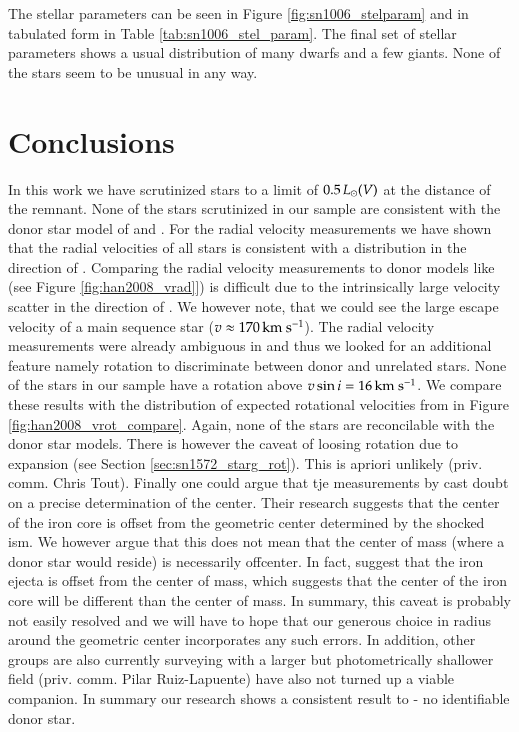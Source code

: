 The stellar parameters can be seen in Figure \ref{fig:sn1006_stelparam} and in tabulated form in Table \ref{tab:sn1006_stel_param}. The final set of stellar parameters shows a usual distribution of many dwarfs and a few giants. None of the stars seem to be unusual in any way. 


\section{Conclusions}
In this work we have scrutinized stars to a limit of $0.5\,\hbox{$L_{\odot}$}(V)$ at the distance of the remnant. None of the stars scrutinized in our sample are consistent with the donor star model of \citet{2000ApJS..128..615M} and \citet{2008A&A...489..943P}. For the radial velocity measurements we have shown that the radial velocities of all stars is consistent with a distribution in the direction of . Comparing the radial velocity measurements to donor models like (see Figure \vref{fig:han2008_vrad}]) is difficult due to the intrinsically large velocity scatter in the direction of . We however note, that we could see the large escape velocity of a main sequence star ($v\approx170\,\textrm{km}~\textrm{s}^{-1}$). The radial velocity measurements were already ambiguous in  and thus we looked for an additional feature namely rotation to discriminate between donor and unrelated stars. None of the stars in our sample have a rotation above $v\sin{i}=16\,\textrm{km}~\textrm{s}^{-1}$. We compare these results with the distribution of expected rotational velocities from \citet{2008ApJ...677L.109H} in Figure \ref{fig:han2008_vrot_compare}. Again, none of the stars are reconcilable with the donor star models. There is however the caveat of loosing rotation due to expansion (see Section \ref{sec:sn1572_starg_rot}). This is apriori unlikely (priv. comm. Chris Tout). Finally one could argue that tje measurements by \citet[see Figure \ref{fig:sn1006_uvprobe}]{2005ApJ...624..189W} cast doubt on a precise determination of the center. Their research suggests that the center of the iron core is offset from the geometric center determined by the shocked \gls{ism}. We however argue that this does not mean that the center of mass (where a donor star would reside) is necessarily offcenter. In fact, \cite{2010ApJ...708.1703M} suggest that the iron ejecta is offset from the center of mass, which suggests that the center of the iron core will be different than the center of mass. In summary, this caveat is probably not easily resolved and we will have to hope that our generous choice in radius around the geometric center incorporates any such errors. In addition, other groups are also currently surveying  with a larger but photometrically shallower field (priv. comm. Pilar Ruiz-Lapuente) have also not turned up a viable companion. In summary our research shows a consistent result to  - no identifiable donor star.

